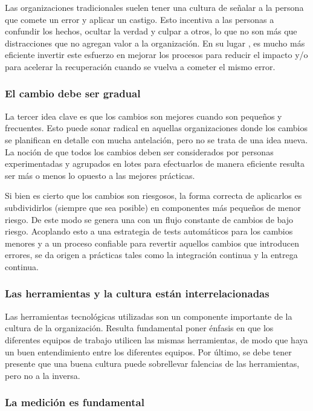 Las organizaciones tradicionales suelen tener una cultura de señalar a
la persona que comete un error y aplicar un castigo. Esto incentiva a
las personas a confundir los hechos, ocultar la verdad y culpar a
otros, lo que no son más que distracciones que no agregan valor a la
organización. En su lugar , es mucho más eficiente invertir este
esfuerzo en mejorar los procesos para reducir el impacto y/o para
acelerar la recuperación cuando se vuelva a cometer el mismo error.

\subsubsection{El cambio debe ser gradual}

La tercer idea clave es que los cambios son mejores cuando son
pequeños y frecuentes. Esto puede sonar radical en aquellas
organizaciones donde los cambios se planifican en detalle con mucha
antelación, pero no se trata de una idea nueva. La noción de que todos
los cambios deben ser considerados por personas experimentadas y
agrupados en lotes para efectuarlos de manera eficiente resulta ser
más o menos lo opuesto a las mejores prácticas.

Si bien es cierto que los cambios son riesgosos, la forma correcta de
aplicarlos es subdividirlos (siempre que sea posible) en componentes
más pequeños de menor riesgo. De este modo se genera una
 con un flujo constante de cambios de bajo
riesgo. Acoplando esto a una estrategia de tests automáticos para los
cambios menores y a un proceso confiable para revertir aquellos
cambios que introducen errores, se da origen a prácticas tales como la
integración continua y la entrega continua.

\subsubsection{Las herramientas y la cultura están interrelacionadas}

Las herramientas tecnológicas utilizadas son un componente importante
de la cultura de la organización. Resulta fundamental poner énfasis en
que los diferentes equipos de trabajo utilicen las mismas
herramientas, de modo que haya un buen entendimiento entre los
diferentes equipos. Por último, se debe tener presente que una buena
cultura puede sobrellevar falencias de las herramientas, pero no a la
inversa.

\subsubsection{La medición es fundamental}

